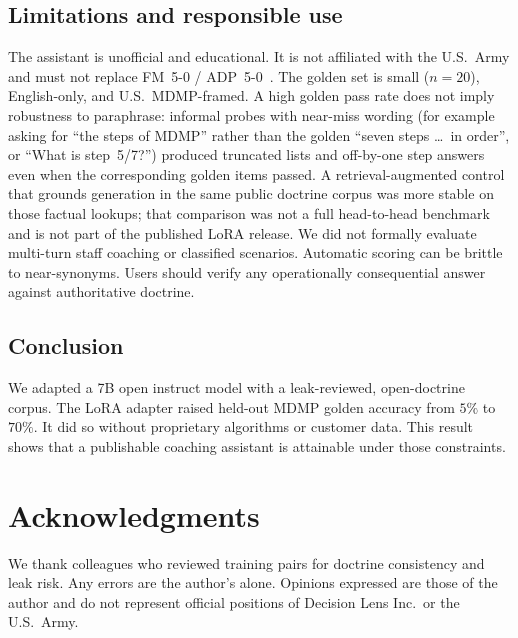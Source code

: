 \documentclass[11pt]{article}
\begin{document}
\subsection{Limitations and responsible use}
\label{sec:discussion-limits}

The assistant is unofficial and educational.
It is not affiliated with the U.S.\ Army and must not replace
\mbox{FM 5-0} / \mbox{ADP 5-0}~\citep{fm50,adp50}.
The golden set is small ($n{=}20$), English-only, and U.S.\ MDMP-framed.
A high golden pass rate does not imply robustness to paraphrase:
informal probes with near-miss wording (for example asking for ``the steps of MDMP''
rather than the golden ``seven steps \ldots\ in order'', or ``What is step~5/7?'')
produced truncated lists and off-by-one step answers even when the corresponding
golden items passed.
A retrieval-augmented control that grounds generation in the same public
doctrine corpus was more stable on those factual lookups; that comparison was
not a full head-to-head benchmark and is not part of the published LoRA release.
We did not formally evaluate multi-turn staff coaching or classified scenarios.
Automatic scoring can be brittle to near-synonyms.
Users should verify any operationally consequential answer against authoritative
doctrine.

\subsection{Conclusion}
\label{sec:discussion-conclusion}

We adapted a 7B open instruct model with a leak-reviewed, open-doctrine corpus.
The LoRA adapter raised held-out MDMP golden accuracy from $5\%$ to $70\%$.
It did so without proprietary algorithms or customer data.
This result shows that a publishable coaching assistant is attainable under
those constraints.

\section*{Acknowledgments}
We thank colleagues who reviewed training pairs for doctrine consistency and
leak risk.
Any errors are the author's alone.
Opinions expressed are those of the author and do not represent official
positions of Decision Lens Inc.\ or the U.S.\ Army.




\appendix
\end{document}
